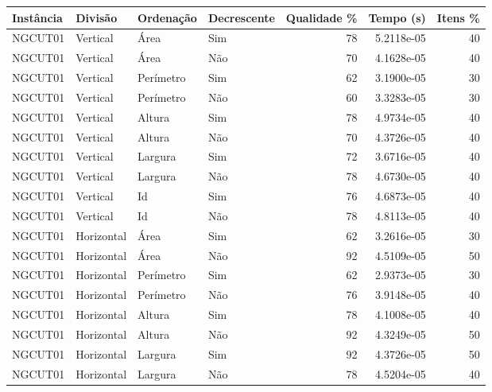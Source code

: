 \begin{tabular}{llllrrr}
    \hline
    Instância & Divisão     & Ordenação & Decrescente & Qualidade \% & Tempo (s)  & Itens \% \\
    \hline
    NGCUT01   & Vertical    & Área      & Sim         & 78           & 5.2118e-05 & 40       \\
    NGCUT01   & Vertical    & Área      & Não         & 70           & 4.1628e-05 & 40       \\
    NGCUT01   & Vertical    & Perímetro & Sim         & 62           & 3.1900e-05 & 30       \\
    NGCUT01   & Vertical    & Perímetro & Não         & 60           & 3.3283e-05 & 30       \\
    NGCUT01   & Vertical    & Altura    & Sim         & 78           & 4.9734e-05 & 40       \\
    NGCUT01   & Vertical    & Altura    & Não         & 70           & 4.3726e-05 & 40       \\
    NGCUT01   & Vertical    & Largura   & Sim         & 72           & 3.6716e-05 & 40       \\
    NGCUT01   & Vertical    & Largura   & Não         & 78           & 4.6730e-05 & 40       \\
    NGCUT01   & Vertical    & Id        & Sim         & 76           & 4.6873e-05 & 40       \\
    NGCUT01   & Vertical    & Id        & Não         & 78           & 4.8113e-05 & 40       \\
    NGCUT01   & Horizontal  & Área      & Sim         & 62           & 3.2616e-05 & 30       \\
    NGCUT01   & Horizontal  & Área      & Não         & 92           & 4.5109e-05 & 50       \\
    NGCUT01   & Horizontal  & Perímetro & Sim         & 62           & 2.9373e-05 & 30       \\
    NGCUT01   & Horizontal  & Perímetro & Não         & 76           & 3.9148e-05 & 40       \\
    NGCUT01   & Horizontal  & Altura    & Sim         & 78           & 4.1008e-05 & 40       \\
    NGCUT01   & Horizontal  & Altura    & Não         & 92           & 4.3249e-05 & 50       \\
    NGCUT01   & Horizontal  & Largura   & Sim         & 92           & 4.3726e-05 & 50       \\
    NGCUT01   & Horizontal  & Largura   & Não         & 78           & 4.5204e-05 & 40       \\

\end{tabular}
